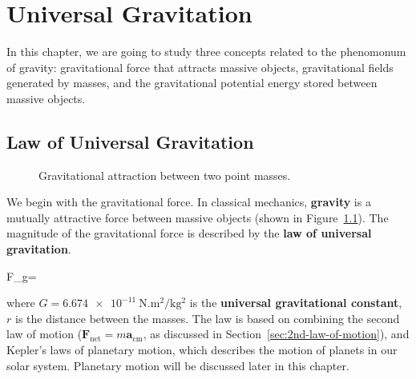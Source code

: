 \chapter{Universal Gravitation}
\label{chapter:gravity}

In this chapter, we are going to study three concepts related to the phenomonum
of gravity: gravitational force that attracts massive objects, gravitational
fields generated by masses, and the gravitational potential energy stored
between massive objects.
 
\section{Law of Universal Gravitation}
\begin{figure}[ht]
  \centering
  \caption{Gravitational attraction between two point masses.}
  \label{fig:grav-force}
\end{figure}
We begin with the gravitational force. In classical mechanics, \textbf{gravity}
is a mutually attractive force between massive objects (shown in
Figure~\ref{fig:grav-force}). The magnitude of the gravitational force is
described by the \textbf{law of universal gravitation}.
\begin{important-equation}
  F_g=
  \label{eq:universal-grav}
\end{important-equation}
where $G=\SI{6.674e-11}{\newton.\metre\squared\per\kilo\gram\squared}$ is the
\textbf{universal gravitational constant}, $r$ is the distance between the
masses. The law is based on combining the second law of motion
($\bm F_\text{net}=m\bm a_\text{cm}$, as discussed in
Section~\ref{sec:2nd-law-of-motion}), and Kepler's laws of planetary motion,
which describes the motion of planets in our solar system. Planetary motion
will be discussed later in this chapter.

